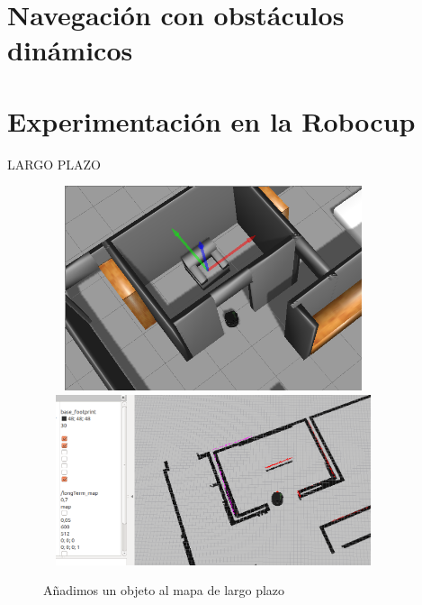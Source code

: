 \section {Navegación con obstáculos dinámicos}
\label{cap:navegacionconobstaculos}

\section {Experimentación en la Robocup}
\label{cap:experimentacionrobocup}




LARGO PLAZO

\begin{figure}[H]
  \begin{center}
    \includegraphics[width=10cm,height=6cm]{img/cap7/addingobject-gazebo}
    \includegraphics[width=10cm,height=5cm]{img/cap7/addingobject-longmap}
  \end{center}
  \caption{Añadimos un objeto al mapa de largo plazo}
  \label{fig:addobjectlongmap}
\end{figure}


